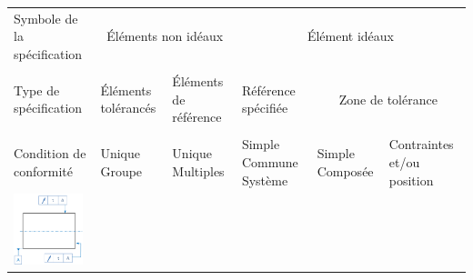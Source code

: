\documentclass[11pt,oneside]{article}
\begin{document}
\begin{exemple}
\footnotesize{
\begin{center}
\begin{tabular}{|p{}|p{}|p{}|p{}|p{}|p{}|}
\hline
Symbole de la spécification & 
\multicolumn{2}{c|}{Éléments non idéaux} &
\multicolumn{3}{c|}{Élément idéaux} \\
&
\multicolumn{2}{c|}{} &
\multicolumn{3}{c|}{}\\
\hline
Type de spécification & 
Éléments tolérancés &
Éléments de référence & 
Référence spécifiée & 
\multicolumn{2}{c|}{Zone de tolérance} \\
&&&&
\multicolumn{2}{c|}{}\\
\hline
Condition de conformité & 
Unique Groupe & Unique Multiples &
Simple Commune Système &
Simple Composée & 
Contraintes et/ou position \\
\hline
\multirow{12}{*}{\includegraphics[width=2cm]{png/ex_battements}}&&&&&\\
&&&&&\\
&&&&&\\
&&&&&\\
&&&&&\\
&&&&&\\
&&&&&\\
&&&&&\\
&&&&&\\
&&&&&\\
&&&&&\\
&&&&&\\
\hline
\end{tabular}
\end{center}
}
\end{exemple}
\end{document}
